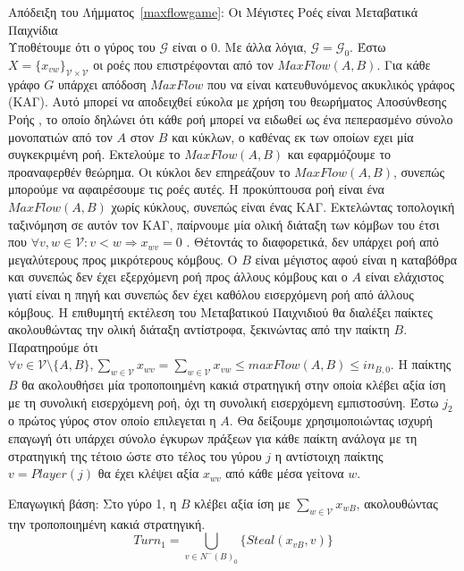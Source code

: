 \begin{sepproof}{Απόδειξη του Λήμματος~\ref{maxflowgame}: Οι Μέγιστες Ροές είναι Μεταβατικά Παιχνίδια} \ \\
\label{maxflowgameproof}
  Υποθέτουμε ότι ο γύρος του $\mathcal{G}$ είναι ο 0. Με άλλα λόγια, $\mathcal{G} = \mathcal{G}_0$. Έστω $X =
  \{x_{vw}\}_{\mathcal{V} \times \mathcal{V}}$ οι ροές που επιστρέφονται από τον $MaxFlow\left(A, B\right)$. Για κάθε γράφο
  $G$ υπάρχει απόδοση $MaxFlow$ που να είναι κατευθυνόμενος ακυκλικός γράφος (ΚΑΓ). Αυτό μπορεί να αποδειχθεί εύκολα με χρήση
  του θεωρήματος Αποσύνθεσης Ροής \cite{amo}, το οποίο δηλώνει ότι κάθε ροή μπορεί να ειδωθεί ως ένα πεπερασμένο σύνολο
  μονοπατιών από τον $A$ στον $B$ και κύκλων, ο καθένας εκ των οποίων εχει μία συγκεκριμένη ροή. Εκτελούμε το $MaxFlow\left(A,
  B\right)$ και εφαρμόζουμε το προαναφερθέν θεώρημα. Οι κύκλοι δεν επηρεάζουν το $MaxFlow\left(A, B\right)$, συνεπώς μπορούμε
  να αφαιρέσουμε τις ροές αυτές. Η προκύπτουσα ροή είναι ένα $MaxFlow\left(A, B\right)$ χωρίς κύκλους, συνεπώς είναι ένας ΚΑΓ.
  Εκτελώντας τοπολογική ταξινόμηση σε αυτόν τον ΚΑΓ, παίρνουμε μία ολική διάταξη των κόμβων του έτσι που $\forall v, w \in
  \mathcal{V} : v < w \Rightarrow x_{wv} = 0$ \cite{clrs}. Θέτοντάς το διαφορετικά, δεν υπάρχει ροή από μεγαλύτερους προς
  μικρότερους κόμβους. Ο $B$ είναι μέγιστος αφού είναι η καταβόθρα και συνεπώς δεν έχει εξερχόμενη ροή προς άλλους κόμβους και
  ο $A$ είναι ελάχιστος γιατί είναι η πηγή και συνεπώς δεν έχει καθόλου εισερχόμενη ροή από άλλους κόμβους. Η επιθυμητή
  εκτέλεση του Μεταβατικού Παιχνιδιού θα διαλέξει παίκτες ακολουθώντας την ολική διάταξη αντίστροφα, ξεκινώντας από την παίκτη
  $B$. Παρατηρού\-με ότι $\forall v \in \mathcal{V} \setminus \{A, B\}, \sum\limits_{w \in \mathcal{V}}x_{wv} = \sum\limits_{w
  \in \mathcal{V}}x_{vw} \leq maxFlow\left(A, B\right) \leq in_{B, 0}$. Η παίκτης $B$ θα ακολουθήσει μία τροποποιημένη κακιά
  στρατηγική στην οποία κλέβει αξία ίση με τη συνολική εισερχόμενη ροή, όχι τη συνολική εισερχόμενη εμπιστοσύνη. Έστω $j_2$ ο
  πρώτος γύρος στον οποίο επιλεγεται η $A$. Θα δείξουμε χρησιμοποιώντας ισχυρή επαγωγή ότι υπάρχει σύνολο έγκυρων πράξεων για
  κάθε παίκτη ανάλογα με τη στρατηγική της τέτοιο ώστε στο τέλος του γύρου $j$ η αντίστοιχη παίκτης $v = Player\left(j\right)$
  θα έχει κλέψει αξία $x_{wv}$ από κάθε μέσα γείτονα $w$.

  Επαγωγική βάση: Στο γύρο 1, η $B$ κλέβει αξία ίση με $\sum\limits_{w \in \mathcal{V}}x_{wB}$, ακολουθώντας την τροποποιημένη
  κακιά στρατηγική.
  \begin{equation*}
    Turn_1 = \bigcup\limits_{v \in N^{-}\left(B\right)_0}\{Steal\left(x_{vB}, v\right)\}
  \end{equation*}


\end{sepproof}
